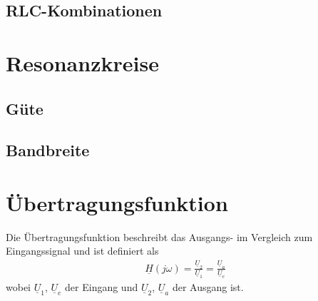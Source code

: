 \subsection{RLC-Kombinationen}

\newpage

\section{Resonanzkreise}

\subsection{Güte}

\subsection{Bandbreite}

\newpage

\section{Übertragungsfunktion}
Die Übertragungsfunktion beschreibt das Ausgangs- im Vergleich zum
Eingangssignal und ist definiert als
\begin{align}
    \underline{H}(j\omega)=\frac{\underline{U}_2}{\underline{U}_1}=\frac{\underline{U}_a}{\underline{U}_e}
\end{align}
wobei $\underline{U}_1$, $\underline{U}_e$ der Eingang und $\underline{U}_2$, $\underline{U}_a$ der Ausgang ist.


